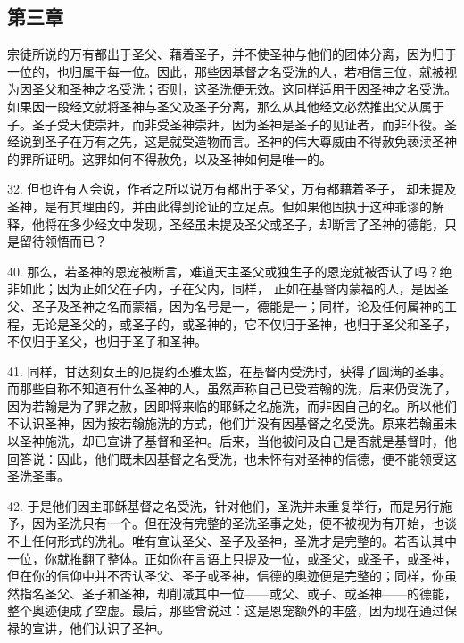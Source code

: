 
\subsection{第三章}

宗徒所说的万有都出于圣父、藉着圣子，并不使圣神与他们的团体分离，因为归于一位的，也归属于每一位。因此，那些因基督之名受洗的人，若相信三位，就被视为因圣父和圣神之名受洗；否则，这圣洗便无效。这同样适用于因圣神之名受洗。如果因一段经文就将圣神与圣父及圣子分离，那么从其他经文必然推出父从属于子。圣子受天使崇拜，而非受圣神崇拜，因为圣神是圣子的见证者，而非仆役。圣经说到圣子在万有之先，这是就受造物而言。圣神的伟大尊威由不得赦免亵渎圣神的罪所证明。这罪如何不得赦免，以及圣神如何是唯一的。\par

32. 但也许有人会说，作者之所以说万有都出于圣父，万有都藉着圣子， 却未提及圣神，是有其理由的，并由此得到论证的立足点。但如果他固执于这种乖谬的解释，他将在多少经文中发现，圣经虽未提及圣父或圣子，却断言了圣神的德能，只是留待领悟而已？\par

40. 那么，若圣神的恩宠被断言，难道天主圣父或独生子的恩宠就被否认了吗？绝非如此；因为正如父在子内，子在父内，同样， 正如在基督内蒙福的人，是因圣父、圣子及圣神之名而蒙福，因为名号是一，德能是一；同样，论及任何属神的工程，无论是圣父的，或圣子的，或圣神的，它不仅归于圣神，也归于圣父和圣子，不仅归于圣父，也归于圣子和圣神。\par

41. 同样，甘达刻女王的厄提约丕雅太监，在基督内受洗时，获得了圆满的圣事。而那些自称不知道有什么圣神的人，虽然声称自己已受若翰的洗，后来仍受洗了，因为若翰是为了罪之赦，因即将来临的耶稣之名施洗，而非因自己的名。所以他们不认识圣神，因为按若翰施洗的方式，他们并没有因基督之名受洗。原来若翰虽未以圣神施洗，却已宣讲了基督和圣神。后来，当他被问及自己是否就是基督时，他回答说：因此，他们既未因基督之名受洗，也未怀有对圣神的信德，便不能领受这圣洗圣事。\par

42. 于是他们因主耶稣基督之名受洗，针对他们，圣洗并未重复举行，而是另行施予，因为圣洗只有一个。但在没有完整的圣洗圣事之处，便不被视为有开始，也谈不上任何形式的洗礼。唯有宣认圣父、圣子及圣神，圣洗才是完整的。若否认其中一位，你就推翻了整体。正如你在言语上只提及一位，或圣父，或圣子，或圣神，但在你的信仰中并不否认圣父、圣子或圣神，信德的奥迹便是完整的；同样，你虽然指名圣父、圣子和圣神，却削减其中一位——或父、或子、或圣神——的德能，整个奥迹便成了空虚。最后，那些曾说过：这是恩宠额外的丰盛，因为现在通过保禄的宣讲，他们认识了圣神。\par

